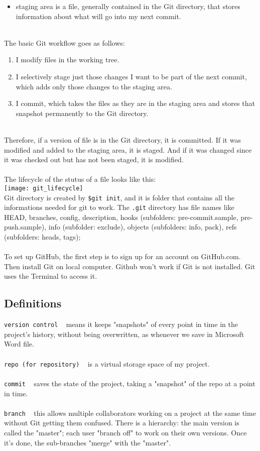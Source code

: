 \documentclass{article}
\begin{document}
{{{\begin{itemize}
  \item staging area is a file, generally contained in the Git directory, that stores information about what will go into my next commit. 
\end{itemize}
\\
The basic Git workflow goes as follows:
\begin{enumerate}
  \item I modify files in the working tree.
  \item I selectively stage just those changes I want to be part of the next commit, which adds only those changes to the staging area.
  \item I commit, which takes the files as they are in the staging area and stores that snapshot permanently to the Git directory. 
\end{enumerate}
\\
Therefore, if a version of file is in the Git directory, it is committed. If it was modified and added to the staging area, it is staged. And if it was changed since it was checked out but has not been staged, it is modified. \\
\\
The lifecycle of the stutus of a file looks like this:\\
\texttt{[image: git\_lifecycle]}\\
Git directory is created by \texttt{\$git init}, and it is folder that contains all the informations needed for git to work. The \texttt{.git} directory has file names like HEAD, branches, config, description, hooks (subfolders: pre-commit.sample, pre-push.sample), info (subfolder: exclude), objects (subfolders: info, pack), refs (subfolders: heads, tags);\\
\\
To set up GitHub, the first step is to sign up for an account on GitHub.com. Then install Git on local computer. Github won't work if Git is not installed. Git uses the Terminal to access it. \\ 
\subsection{Definitions}
\texttt{version control} ~ means it keeps "snapshots" of every point in time in the project's history, without being overwritten, as whenever we save in Microsoft Word file.\\
\\
\texttt{repo (for repository)} ~ is a virtual storage space of my project. \\
\\
\texttt{commit} ~  saves the state of the project, taking a "snapshot" of the repo at a point in time.\\
\\
\texttt{branch} ~ this allows multiple collaborators working on a project at the same time without Git getting them confused. There is a hierarchy: the main version is called the "master"; each user "branch off" to work on their own versions. Once it's done, the sub-branches "merge" with the "master". \\

}}}
\end{document}
